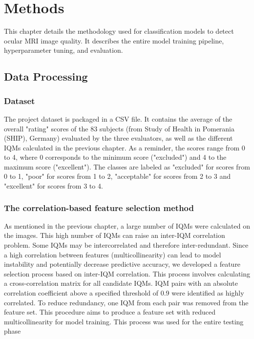 \chapter{Methods}
\label{chap:methods}

This chapter details the methodology used for classification models to detect ocular MRI image quality. It describes the entire model training pipeline, hyperparameter tuning, and evaluation.

\section{Data Processing}
\label{sec:data_processing}

\subsection{Dataset}
\label{ssec:data_acquisition_methods} %
The project dataset is packaged in a CSV file. It contains the average of the overall "rating" scores of the 83 subjects (from Study of Health in Pomerania (SHIP), Germany) evaluated by the three evaluators, as well as the different IQMs calculated in the previous chapter. As a reminder, the scores range from 0 to 4, where 0 corresponds to the minimum score ("excluded") and 4 to the maximum score ("excellent"). The classes are labeled as "excluded" for scores from 0 to 1, "poor" for scores from 1 to 2, "acceptable" for scores from 2 to 3 and "excellent" for scores from 3 to 4.

\subsection{The correlation-based feature selection method}
\label{ssec:feature_preparation_methods}
As mentioned in the previous chapter, a large number of IQMs were calculated on the images. This high number of IQMs can raise an inter-IQM correlation problem. Some IQMs may be intercorrelated and therefore inter-redundant. Since a high correlation between features (multicollinearity) can lead to model instability and potentially decrease predictive accuracy, we developed a feature selection process based on inter-IQM correlation. This process involves calculating a cross-correlation matrix for all candidate IQMs. IQM pairs with an absolute correlation coefficient above a specified threshold of 0.9 were identified as highly correlated. To reduce redundancy, one IQM from each pair was removed from the feature set. This procedure aims to produce a feature set with reduced multicollinearity for model training. This process was used for the entire testing phase

